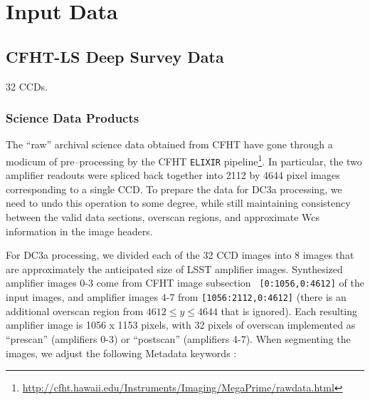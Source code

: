 
\section{Input Data}


\subsection{CFHT-LS Deep Survey Data}

32 CCDs.

\subsubsection{Science Data Products}

The ``raw'' archival science data obtained from CFHT have  gone through
a modicum of pre--processing by the CFHT {\tt ELIXIR}
pipeline\footnote{\url{http://cfht.hawaii.edu/Instruments/Imaging/MegaPrime/rawdata.html}}.
In particular, the two amplifier readouts were spliced back together
into 2112 by 4644 pixel images corresponding to a single CCD.  To prepare the data for DC3a processing, we need
to undo this operation to some degree, while still maintaining
consistency between the valid data sections, overscan regions, and
approximate Wcs information in the image headers.

For DC3a processing, we divided each of the 32 CCD images into 8 images
that are approximately the anticipated size of LSST amplifier images.
Synthesized amplifier images 0-3 come from CFHT image subsection {\tt
[0:1056,0:4612]} of the input images, and amplifier images 4-7 from
{\tt [1056:2112,0:4612]} (there is an additional overscan region from
$4612 \leq y \leq 4644$ that is ignored).  Each resulting amplifier
image is 1056 x 1153 pixels, with 32 pixels of overscan implemented as
``prescan'' (amplifiers 0-3) or ``postscan'' (amplifiers 4-7).  When segmenting the images, we adjust the following Metadata keywords :


